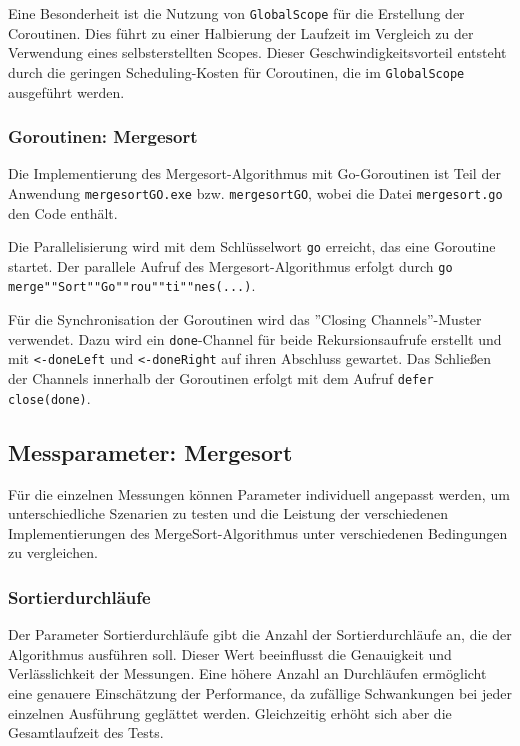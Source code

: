 \documentclass[fontsize=12pt,paper=a4,twoside=semi,parskip=half-,headsepline,headinclude]{scrreprt}
\begin{document}
Eine Besonderheit ist die Nutzung von \texttt{GlobalScope} für die Erstellung der Coroutinen. Dies führt zu einer Halbierung der Laufzeit im Vergleich zu der Verwendung eines selbst\-erstellten Scopes. Dieser Geschwindigkeitsvorteil entsteht durch die geringen Scheduling-Kosten für Coroutinen, die im \texttt{GlobalScope} ausgeführt werden.

\subsubsection{Goroutinen: Mergesort}

Die Implementierung des Mergesort-Algorithmus mit Go-Goroutinen ist Teil der Anwendung \texttt{mergesortGO.exe} bzw. \texttt{mergesortGO}, wobei die Datei \texttt{mergesort.go} den Code enthält.

Die Parallelisierung wird mit dem Schlüsselwort \texttt{go} erreicht, das eine Goroutine startet. Der parallele Aufruf des Mergesort-Algorithmus erfolgt durch \texttt{go merge""Sort""Go""rou""ti""nes(...)}. 

Für die Synchronisation der Goroutinen wird das ''Closing Channels''-Muster verwendet. Dazu wird ein \texttt{done}-Channel für beide Rekursionsaufrufe erstellt und mit \texttt{<-doneLeft} und \texttt{<-doneRight} auf ihren Abschluss gewartet. Das Schließen der Channels innerhalb der Goroutinen erfolgt mit dem Aufruf \texttt{defer close(done)}.

\subsection{Messparameter: Mergesort}
\label{subsec:mergsortpara}

Für die einzelnen Messungen können Parameter individuell angepasst werden, um unterschiedliche Szenarien zu testen und die Leistung der verschiedenen Implementierungen des MergeSort-Algorithmus unter verschiedenen Bedingungen zu 
vergleichen.

\subsubsection{Sortierdurchläufe}

Der Parameter Sortierdurchläufe gibt die Anzahl der Sortierdurchläufe an, die der Algorithmus ausführen soll. Dieser Wert beeinflusst die Genauigkeit und Verlässlichkeit der Messungen. Eine höhere Anzahl an Durchläufen ermöglicht 
eine genauere Einschätzung der Performance, da zufällige Schwankungen bei jeder einzelnen Ausführung geglättet werden. Gleichzeitig erhöht sich aber die Gesamtlaufzeit des Tests.
\end{document}
